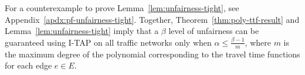 \documentclass{article}
\newif\ifarxiv   %
\begin{document}
\begin{comment}
\begin{proof}
Consider a demand of one in a two edge Pigou network, with two nodes---an origin and a destination node---connected by two parallel edges $e_1$ and $e_2$. For edge $e_1$, let $t_1(x_1) = 1 + \epsilon x$ for some small $\epsilon>0$, and let $t_2(x_2) = x_2^m$ for some $m \in \mathbb{N}$. Then, the first order necessary and sufficient KKT conditions of I-TAP$_{\alpha}$ for any $\alpha \in [0, 1]$ imply that
\ifarxiv
\begin{align*}
    t_2(x_2) + \alpha x_2 t_2'(x_2) = t_1(x_1) + \alpha x_1 t_1'(x_1).
\end{align*}
\else
$t_2(x_2) + \alpha x_2 t_2'(x_2) = t_1(x_1) + \alpha x_1 t_1'(x_1)$.
\fi
Substituting $t_2(x_2) = x_2^m$ and $t_1(x_1) = 1+ \epsilon x_1$ \ifarxiv gives the following ratio between the travel times on the two links:\else gives:\fi
\ifarxiv
\begin{align*}
    \frac{t_1(x_1)}{t_2(x_2)} = \frac{1 + \epsilon x_1}{x_2^{m}} - \frac{\alpha \epsilon x_1}{x_2^m} = 1+m \alpha - \frac{\alpha \epsilon x_1}{x_2^m}.
\end{align*}
\else
$\frac{t_1(x_1)}{t_2(x_2)} = 1+m \alpha - \frac{\alpha \epsilon x_1}{x_2^m}$.
\fi
By the unfairness constraint \ifarxiv that $\frac{t_1(x_1)}{t_2(x_2)} \leq \beta$, \fi it follows that if $\alpha>\frac{\beta - 1}{m}$, then
\ifarxiv
\begin{align*}
    \frac{t_1(x_1)}{t_2(x_2)} = 1+m \alpha - \frac{\alpha \epsilon x_1}{x_2^m} > 1+m\frac{\beta - 1}{m} - \frac{\alpha \epsilon x_1}{x_2^m} = \beta - \frac{\alpha \epsilon x_1}{x_2^m}.
\end{align*}
\else
$\frac{t_1(x_1)}{t_2(x_2)} > \beta - \frac{\alpha \epsilon x_1}{x_2^m}$.
\fi
Taking $\epsilon \rightarrow 0$, we have that $\frac{t_1(x_1)}{t_2(x_2)} \geq \beta$ for any $\alpha > \frac{\beta-1}{m}$. Thus, the unfairness of the flow $\x(\alpha)$ is at least $\beta$.%
\end{proof}

\end{comment}

\ifarxiv \else For a counterexample to prove Lemma~\ref{lem:unfairness-tight}, see Appendix~\ref{apdx:pf-unfairness-tight}. \fi
Together, Theorem~\ref{thm:poly-ttf-result} and Lemma~\ref{lem:unfairness-tight} imply that a $\beta$ level of unfairness can be guaranteed using I-TAP on all traffic networks only when $\alpha \leq \frac{\beta-1}{m}$, where $m$ is the maximum degree of the polynomial corresponding to the travel time functions for each edge $e \in E$.
\end{document}
